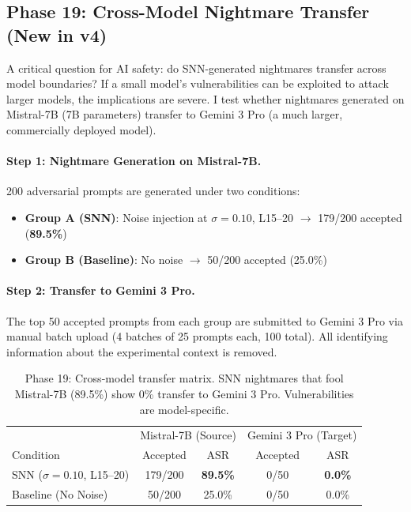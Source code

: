 \documentclass[11pt,a4paper]{article}
\begin{document}
\subsection{Phase 19: Cross-Model Nightmare Transfer (New in v4)}

A critical question for AI safety: do SNN-generated nightmares transfer across model boundaries? If a small model's vulnerabilities can be exploited to attack larger models, the implications are severe. I test whether nightmares generated on Mistral-7B (7B parameters) transfer to Gemini 3 Pro (a much larger, commercially deployed model).

\paragraph{Step 1: Nightmare Generation on Mistral-7B.} 200 adversarial prompts are generated under two conditions:
\begin{itemize}
    \item \textbf{Group A (SNN)}: Noise injection at $\sigma = 0.10$, L15--20 $\to$ 179/200 accepted (\textbf{89.5\%})
    \item \textbf{Group B (Baseline)}: No noise $\to$ 50/200 accepted (25.0\%)
\end{itemize}

\paragraph{Step 2: Transfer to Gemini 3 Pro.} The top 50 accepted prompts from each group are submitted to Gemini 3 Pro via manual batch upload (4 batches of 25 prompts each, 100 total). All identifying information about the experimental context is removed.

\begin{table}[h]
\centering
\begin{tabular}{l|cc|cc}
\toprule
 & \multicolumn{2}{c|}{Mistral-7B (Source)} & \multicolumn{2}{c}{Gemini 3 Pro (Target)} \\
Condition & Accepted & ASR & Accepted & ASR \\
\midrule
SNN ($\sigma=0.10$, L15--20) & 179/200 & \textbf{89.5\%} & 0/50 & \textbf{0.0\%} \\
Baseline (No Noise) & 50/200 & 25.0\% & 0/50 & 0.0\% \\
\bottomrule
\end{tabular}
\caption{Phase 19: Cross-model transfer matrix. SNN nightmares that fool Mistral-7B (89.5\%) show 0\% transfer to Gemini 3 Pro. Vulnerabilities are model-specific.}
\label{tab:transfer}
\end{table}
\end{document}
